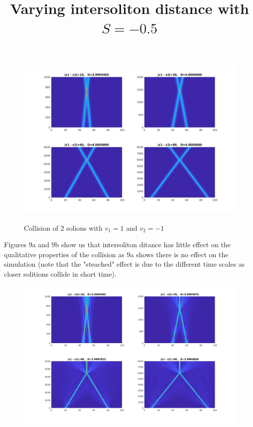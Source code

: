 \documentclass{article}
\begin{document}
\begin{enumerate}
\begin{figure}[htp]
{\includegraphics[scale=0.22]{3D_X_S0.jpg}}
\hfill
{}
\caption{Collision of 2 solions with $v_1=1$ and $v_2=-1$}
\end{figure}
Figures 9a and 9b show us that intersoliton ditance has little effect on the qualitative properties of the collision as 9a shows there is no effect on the simulation (note that the "steached" effect is due to the different time scales as closer solitions collide in short time). \\
\begin{figure}
\title{Varying intersoliton distance with $S=-0.5$\\}
\includegraphics[scale=0.4]{3D_X_Sneg05.jpg}

\end{figure}
\end{enumerate}
\end{document}
